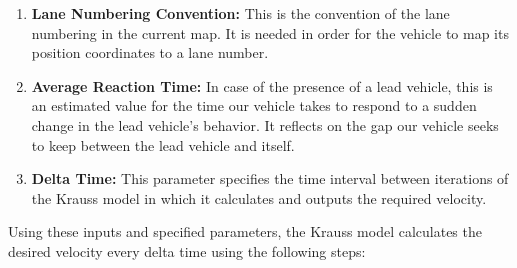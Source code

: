 \begin{itemize}
\begin{enumerate}
            \item \textbf{Lane Numbering Convention:} This is the convention of the lane numbering in the current map. It is needed in order for the vehicle to map its position coordinates to a lane number.
            \item \textbf{Average Reaction Time:} In case of the presence of a lead vehicle, this is an estimated value for the time our vehicle takes to respond to a sudden change in the lead vehicle's behavior. It reflects on the gap our vehicle seeks to keep between the lead vehicle and itself.
            \item \textbf{Delta Time:} This parameter specifies the time interval between iterations of the Krauss model in which it calculates and outputs the required velocity.
        \end{enumerate}
\end{itemize} 
Using these inputs and specified parameters, the Krauss model calculates the desired velocity every delta time using the following steps:

